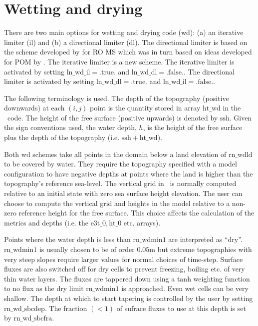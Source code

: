\documentclass[../main/NEMO_manual]{subfiles}
\begin{document}
\section{Wetting and drying }
\label{sec:DYN_wetdry}

There are two main options for wetting and drying code (wd):
(a) an iterative limiter (il) and (b) a directional limiter (dl).
The directional limiter is based on the scheme developed by \cite{warner.defne.ea_CG13} for RO
MS
which was in turn based on ideas developed for POM by \cite{oey_OM06}. The iterative
limiter is a new scheme.  The iterative limiter is activated by setting $\mathrm{ln\_wd\_il} = \mathrm{.true.}$
and $\mathrm{ln\_wd\_dl} = \mathrm{.false.}$. The directional limiter is activated
by setting $\mathrm{ln\_wd\_dl} = \mathrm{.true.}$ and $\mathrm{ln\_wd\_il} = \mathrm{.false.}$.

\begin{listing}
  \caption{}
  \label{lst:namwad}
\end{listing}

The following terminology is used. The depth of the topography (positive downwards)
at each $(i,j)$ point is the quantity stored in array $\mathrm{ht\_wd}$ in the \NEMO\ code.
The height of the free surface (positive upwards) is denoted by $ \mathrm{ssh}$. Given the sign
conventions used, the water depth, $h$, is the height of the free surface plus the depth of the
topography (i.e. $\mathrm{ssh} + \mathrm{ht\_wd}$).

Both wd schemes take all points in the domain below a land elevation of $\mathrm{rn\_wdld}$ to be
covered by water. They require the topography specified with a model
configuration to have negative depths at points where the land is higher than the
topography's reference sea-level. The vertical grid in \NEMO\ is normally computed relative to an
initial state with zero sea surface height elevation.
The user can choose to compute the vertical grid and heights in the model relative to
a non-zero reference height for the free surface. This choice affects the calculation of the metrics and depths
(i.e. the $\mathrm{e3t\_0, ht\_0}$ etc. arrays).

Points where the water depth is less than $\mathrm{rn\_wdmin1}$ are interpreted as ``dry''.
$\mathrm{rn\_wdmin1}$ is usually chosen to be of order $0.05$m but extreme topographies
with very steep slopes require larger values for normal choices of time-step. Surface fluxes
are also switched off for dry cells to prevent freezing, boiling etc. of very thin water layers.
The fluxes are tappered down using a $\mathrm{tanh}$ weighting function
to no flux as the dry limit $\mathrm{rn\_wdmin1}$ is approached. Even wet cells can be very shallow.
The depth at which to start tapering is controlled by the user by setting $\mathrm{rn\_wd\_sbcdep}$.
The fraction $(<1)$ of sufrace fluxes to use at this depth is set by $\mathrm{rn\_wd\_sbcfra}$.
\end{document}
